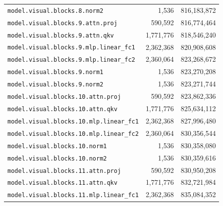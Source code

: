 \documentclass[10pt,a4paper]{article}
\theoremstyle{definition}
\begin{document}
\begin{appendices}
\begin{longtable}{p{9.5cm}rr}
\texttt{model.\allowbreak{}visual.\allowbreak{}blocks.\allowbreak{}8.\allowbreak{}norm2} & 1,536 & 816,183,872 \\
\texttt{model.\allowbreak{}visual.\allowbreak{}blocks.\allowbreak{}9.\allowbreak{}attn.\allowbreak{}proj} & 590,592 & 816,774,464 \\
\texttt{model.\allowbreak{}visual.\allowbreak{}blocks.\allowbreak{}9.\allowbreak{}attn.\allowbreak{}qkv} & 1,771,776 & 818,546,240 \\
\texttt{model.\allowbreak{}visual.\allowbreak{}blocks.\allowbreak{}9.\allowbreak{}mlp.\allowbreak{}linear\_fc1} & 2,362,368 & 820,908,608 \\
\texttt{model.\allowbreak{}visual.\allowbreak{}blocks.\allowbreak{}9.\allowbreak{}mlp.\allowbreak{}linear\_fc2} & 2,360,064 & 823,268,672 \\
\texttt{model.\allowbreak{}visual.\allowbreak{}blocks.\allowbreak{}9.\allowbreak{}norm1} & 1,536 & 823,270,208 \\
\texttt{model.\allowbreak{}visual.\allowbreak{}blocks.\allowbreak{}9.\allowbreak{}norm2} & 1,536 & 823,271,744 \\
\texttt{model.\allowbreak{}visual.\allowbreak{}blocks.\allowbreak{}10.\allowbreak{}attn.\allowbreak{}proj} & 590,592 & 823,862,336 \\
\texttt{model.\allowbreak{}visual.\allowbreak{}blocks.\allowbreak{}10.\allowbreak{}attn.\allowbreak{}qkv} & 1,771,776 & 825,634,112 \\
\texttt{model.\allowbreak{}visual.\allowbreak{}blocks.\allowbreak{}10.\allowbreak{}mlp.\allowbreak{}linear\_fc1} & 2,362,368 & 827,996,480 \\
\texttt{model.\allowbreak{}visual.\allowbreak{}blocks.\allowbreak{}10.\allowbreak{}mlp.\allowbreak{}linear\_fc2} & 2,360,064 & 830,356,544 \\
\texttt{model.\allowbreak{}visual.\allowbreak{}blocks.\allowbreak{}10.\allowbreak{}norm1} & 1,536 & 830,358,080 \\
\texttt{model.\allowbreak{}visual.\allowbreak{}blocks.\allowbreak{}10.\allowbreak{}norm2} & 1,536 & 830,359,616 \\
\texttt{model.\allowbreak{}visual.\allowbreak{}blocks.\allowbreak{}11.\allowbreak{}attn.\allowbreak{}proj} & 590,592 & 830,950,208 \\
\texttt{model.\allowbreak{}visual.\allowbreak{}blocks.\allowbreak{}11.\allowbreak{}attn.\allowbreak{}qkv} & 1,771,776 & 832,721,984 \\
\texttt{model.\allowbreak{}visual.\allowbreak{}blocks.\allowbreak{}11.\allowbreak{}mlp.\allowbreak{}linear\_fc1} & 2,362,368 & 835,084,352 \\

\end{longtable}
\end{appendices}
\end{document}
